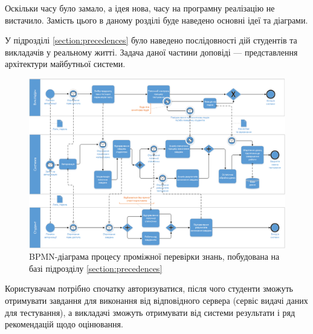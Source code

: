 




Оскільки часу було замало, а ідея нова, часу на програмну реалізацію не
вистачило.
Замість цього в даному розділі буде наведено основні ідеї та діаграми.

У підрозділі \ref{section:precedences} було наведено послідовності дій студентів
та викладачів у реальному житті.
Задача даної частини доповіді --- представлення архітектури майбутньої системи.

\begin{figure}[htbp]
    \center\includegraphics[width=\textwidth]{images/bpmn_tests.png}
    \caption{BPMN-діаграма процесу проміжної перевірки знань,
    побудована на базі підрозділу \ref{section:precedences}}\label{fig:bpmn_tests}
\end{figure}

Користувачам потрібно спочатку авторизуватися, після чого студенти зможуть
отримувати завдання для виконання від відповідного сервера (сервіс видачі даних
для тестування), а викладачі зможуть отримувати від системи результати і ряд
рекомендацій щодо оцінювання.

